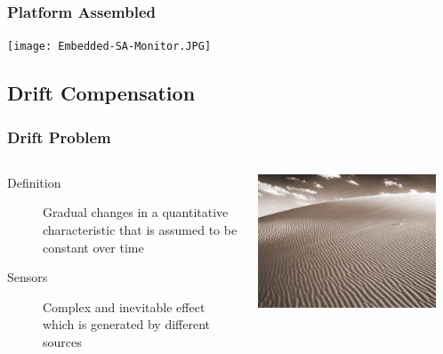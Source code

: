 \documentclass{beamer}
\begin{document}
\begin{frame}
  \frametitle{Platform Assembled}

  \begin{center}
    \texttt{[image: Embedded-SA-Monitor.JPG]}
  \end{center}
\end{frame}

\subsection{Drift Compensation}

\begin{frame}
\frametitle{Drift Problem}
\begin{columns}
\begin{description}%
  \item[Definition] Gradual changes in a quantitative characteristic 
  that is assumed to be constant over time
  \item [Sensors] Complex and inevitable effect which is generated by different sources
\end{description}
  \includegraphics[width=0.9\textwidth]{images/wind-sand-sky.jpg} 
\end{columns}


\end{frame}
\end{document}
